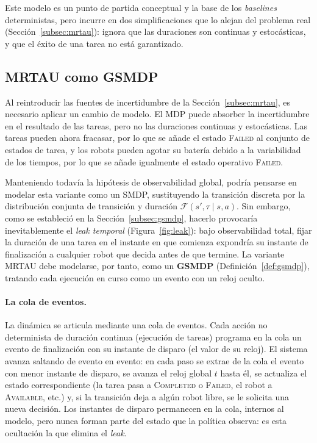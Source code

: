 Este modelo es un punto de partida conceptual y la base de los \textit{baselines} deterministas, pero incurre en dos simplificaciones que lo alejan del problema real (Sección~\ref{subsec:mrtau}): ignora que las duraciones son continuas y estocásticas, y que el éxito de una tarea no está garantizado.

\subsection{MRTAU como GSMDP} \label{subsec:mrtau-gsmdp} %
 
Al reintroducir las fuentes de incertidumbre de la Sección~\ref{subsec:mrtau}, es necesario aplicar un cambio de modelo. El MDP puede absorber la incertidumbre en el resultado de las tareas, pero no las duraciones continuas y estocásticas. Las tareas pueden ahora fracasar, por lo que se añade el estado \textsc{Failed} al conjunto de estados de tarea, y los robots pueden agotar su batería debido a la variabilidad de los tiempos, por lo que se añade igualmente el estado operativo \textsc{Failed}.
 
Manteniendo todavía la hipótesis de observabilidad global, podría pensarse en modelar esta variante como un SMDP, sustituyendo la transición discreta por la distribución conjunta de transición y duración $\mathcal{F}(s',\tau\mid s,a)$. Sin embargo, como se estableció en la Sección~\ref{subsec:gsmdp}, hacerlo provocaría inevitablemente el \emph{leak temporal} (Figura~\ref{fig:leak}): bajo observabilidad total, fijar la duración de una tarea en el instante en que comienza expondría su instante de finalización a cualquier robot que decida antes de que termine. La variante MRTAU debe modelarse, por tanto, como un \textbf{GSMDP} (Definición~\ref{def:gsmdp}), tratando cada ejecución en curso como un evento con un reloj oculto.
 
\paragraph{La cola de eventos.} La dinámica se articula mediante una cola de eventos. Cada acción no determinista de duración continua (ejecución de tareas) programa en la cola un evento de finalización con su instante de disparo (el valor de su reloj). El sistema avanza saltando de evento en evento: en cada paso se extrae de la cola el evento con menor instante de disparo, se avanza el reloj global $t$ hasta él, se actualiza el estado correspondiente (la tarea pasa a \textsc{Completed} o \textsc{Failed}, el robot a \textsc{Available}, etc.) y, si la transición deja a algún robot libre, se le solicita una nueva decisión. Los instantes de disparo permanecen en la cola, internos al modelo, pero nunca forman parte del estado que la política observa: es esta ocultación la que elimina el \emph{leak}.
 
